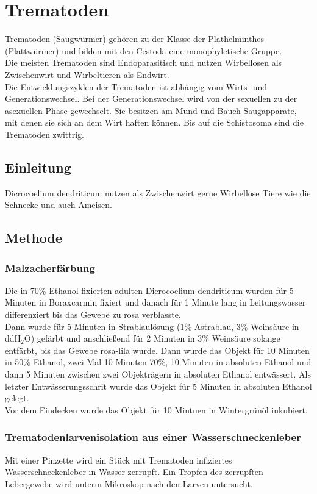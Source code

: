 \documentclass[oneside,10pt,a4paper]{report}
\begin{document}
	
	
	\chapter{Trematoden}
		Trematoden (Saugwürmer) gehören zu der Klasse der Plathelminthes (Plattwürmer) und bilden mit den Cestoda eine monophyletische Gruppe.\\
		Die meisten Trematoden sind Endoparasitisch und nutzen Wirbellosen als Zwischenwirt und Wirbeltieren als Endwirt.\\
		Die Entwicklungszyklen der Trematoden ist abhängig vom Wirts- und Generationswechsel. Bei der Generationswechsel wird von der sexuellen zu der asexuellen Phase gewechselt.
		Sie besitzen am Mund und Bauch Saugapparate, mit denen sie sich an dem Wirt haften können. Bis auf die Schistosoma sind die Trematoden zwittrig.
		\section{Einleitung}
			Dicrocoelium dendriticum nutzen als Zwischenwirt gerne Wirbellose Tiere wie die Schnecke und auch Ameisen.
			
		\section{Methode}
			\subsection{Malzacherfärbung}
			Die in 70$\%$ Ethanol fixierten adulten Dicrocoelium dendriticum wurden für 5 Minuten in Boraxcarmin fixiert und danach für 1 Minute lang in Leitungswasser differenziert bis das Gewebe zu rosa verblasste.\\
			Dann wurde für 5 Minuten in Strablaulösung (1$\%$ Astrablau, 3$\%$ Weinsäure in ddH$_2$O) gefärbt und anschließend für 2 Minuten in 3$\%$ Weinsäure solange entfärbt, bis das Gewebe rosa-lila wurde.
			Dann wurde das Objekt für 10 Minuten in 50$\%$ Ethanol, zwei Mal 10 Minuten 70$\%$, 10 Minuten in absoluten Ethanol und dann 5 Minuten zwischen zwei Objekträgern in absoluten Ethanol entwässert. Als letzter Entwässerungsschrit wurde das Objekt für 5 Minuten in absoluten Ethanol gelegt.\\
			Vor dem Eindecken wurde das Objekt für 10 Mintuen in Wintergrünöl inkubiert.\\
			
			
			\subsection{Trematodenlarvenisolation aus einer Wasserschneckenleber}
				Mit einer Pinzette wird ein Stück mit Trematoden infiziertes Wasserschneckenleber in Wasser zerrupft. Ein Tropfen des zerrupften Lebergewebe wird unterm Mikroskop nach den Larven untersucht.
\end{document}
